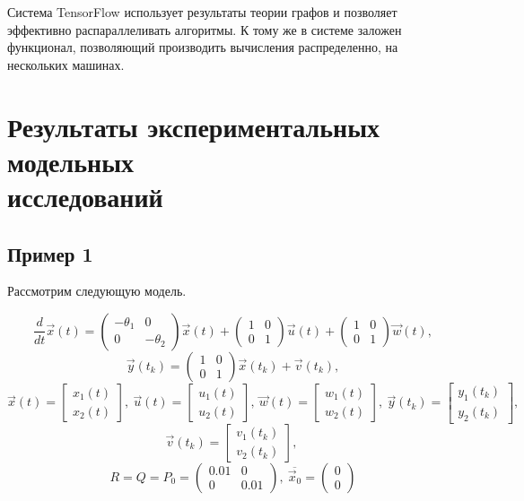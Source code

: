 \documentclass[a4paper,14pt]{extarticle}
\begin{document}
Система TensorFlow использует результаты теории графов и позволяет эффективно 
распараллеливать алгоритмы. К тому же в системе заложен функционал, позволяющий
производить вычисления распределенно, на нескольких машинах.

\newpage
\section[Результаты экспериментальных модельных исследований]
{Результаты экспериментальных модельных \\исследований} 

\subsection{Пример 1}

Рассмотрим следующую модель.

\[
	\frac{d}{dt}\vec{x}(t) =
		\begin{pmatrix}
			-\theta_1 & 0 \\
			0 & -\theta_2
		\end{pmatrix}
		\vec{x}(t) 
		+
		\begin{pmatrix}
			1 & 0 \\
			0 & 1
		\end{pmatrix}
		\vec{u}(t) 
		+
		\begin{pmatrix}
			1 & 0 \\
			0 & 1
		\end{pmatrix}
		\vec{w}(t),
\]
\[
	\vec{y}(t_k) =
	\begin{pmatrix}
		1 & 0 \\
		0 & 1
	\end{pmatrix}
	\vec{x}(t_k) 
	+ 
	\vec{v}(t_k),
\]
\[
	\vec{x}(t) = \begin{bmatrix} x_1(t) \\ x_2(t) \end{bmatrix},\ 
	\vec{u}(t) = \begin{bmatrix} u_1(t) \\ u_2(t) \end{bmatrix},\
	\vec{w}(t) = \begin{bmatrix} w_1(t) \\ w_2(t) \end{bmatrix},\
	\vec{y}(t_k) = \begin{bmatrix} y_1(t_k) \\ y_2(t_k) \end{bmatrix},\
\]
\[
	\vec{v}(t_k) = \begin{bmatrix} v_1(t_k) \\ v_2(t_k) \end{bmatrix},\
\]
\[
	R = Q = P_0 = \begin{pmatrix} 0.01 & 0 \\ 0 & 0.01 \end{pmatrix},\
		\overline{\vec{x}_0} = \begin{pmatrix} 0 \\ 0 \end{pmatrix}
\]
\end{document}
